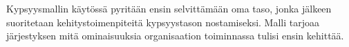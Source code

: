 \documentclass[finnish,12pt,a4paper,pdftex]{article}
\begin{document}
\noindent Kypsyysmallin käytössä pyritään ensin selvittämään oma taso, jonka jälkeen suoritetaan kehitystoimenpiteitä kypsyystason nostamiseksi. Malli tarjoaa järjestyksen mitä ominaisuuksia organisaation toiminnassa tulisi ensin kehittää. \citep{okaytannot} \\




\end{document}
